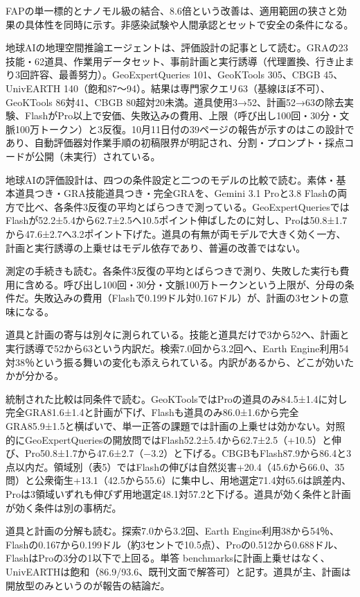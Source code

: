 \documentclass[lualatex,a4paper,10pt]{jlreq}
\begin{document}
FAPの単一標的とナノモル級の結合、8.6倍という改善は、適用範囲の狭さと効果の具体性を同時に示す。非感染試験や人間承認とセットで安全の条件になる。
\cite{B46,B83,B44,B43,B45}


地球AIの地理空間推論エージェントは、評価設計の記事として読む。GRAの23技能・62道具、作業用データセット、事前計画と実行誘導（代理置換、行き止まり3回許容、最善努力）。GeoExpertQueries 101、GeoKTools 305、CBGB 45、UnivEARTH 140（飽和87〜94）。結果は専門家クエリ63（基線ほぼ不可）、GeoKTools 86対41、CBGB 80超対20未満。道具使用3→52、計画52→63の除去実験、FlashがPro以上で安価、失敗込みの費用、上限（呼び出し100回・30分・文脈100万トークン）と3反復。10月11日付の39ページの報告が示すのはこの設計であり、自動評価器対作業手順の初稿限界が明記され、分割・プロンプト・採点コードが公開（未実行）されている。
\cite{B47,B84,B48,B61}


地球AIの評価設計は、四つの条件設定と二つのモデルの比較で読む。素体・基本道具つき・GRA技能道具つき・完全GRAを、Gemini 3.1 Proと3.8 Flashの両方で比べ、各条件3反復の平均とばらつきで測っている。GeoExpertQueriesではFlashが52.2±5.4から62.7±2.5へ10.5ポイント伸ばしたのに対し、Proは50.8±1.7から47.6±2.7へ3.2ポイント下げた。道具の有無が両モデルで大きく効く一方、計画と実行誘導の上乗せはモデル依存であり、普遍の改善ではない。
\cite{B47,B84,B48}


測定の手続きも読む。各条件3反復の平均とばらつきで測り、失敗した実行も費用に含める。呼び出し100回・30分・文脈100万トークンという上限が、分母の条件だ。失敗込みの費用（Flashで0.199ドル対0.167ドル）が、計画の3セントの意味になる。
\cite{B47,B84,B48}


道具と計画の寄与は別々に測られている。技能と道具だけで3から52へ、計画と実行誘導で52から63という内訳だ。検索7.0回から3.2回へ、Earth Engine利用54対38％という振る舞いの変化も添えられている。内訳があるから、どこが効いたかが分かる。
\cite{B47,B84,B48}


統制された比較は同条件で読む。GeoKToolsではProの道具のみ84.5±1.4に対し完全GRA81.6±1.4と計画が下げ、Flashも道具のみ86.0±1.6から完全GRA85.9±1.5と横ばいで、単一正答の課題では計画の上乗せは効かない。対照的にGeoExpertQueriesの開放問ではFlash52.2±5.4から62.7±2.5（+10.5）と伸び、Pro50.8±1.7から47.6±2.7（−3.2）と下げる。CBGBもFlash87.9から86.4と3点以内だ。領域別（表5）ではFlashの伸びは自然災害+20.4（45.6から66.0、35問）と公衆衛生+13.1（42.5から55.6）に集中し、用地選定71.4対65.6は誤差内、Proは3領域いずれも伸びず用地選定48.1対57.2と下げる。道具が効く条件と計画が効く条件は別の事柄だ。
\cite{B47,B84,B48}


道具と計画の分解も読む。探索7.0から3.2回、Earth Engine利用38から54％、Flashの0.167から0.199ドル（約3セントで10.5点）、Proの0.512から0.688ドル、FlashはProの3分の1以下で上回る。単答 benchmarksに計画上乗せはなく、UnivEARTHは飽和（86.9/93.6、既刊文面で解答可）と記す。道具が主、計画は開放型のみというのが報告の結論だ。
\cite{B47,B84,B48}
\end{document}
